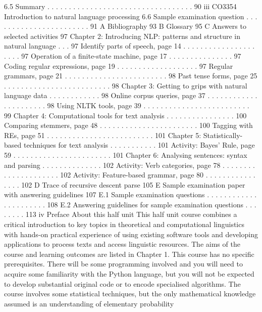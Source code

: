6.5 Summary . . . . . . . . . . . . . . . . . . . . . . . . . . . . . . . . . . 90
iii
CO3354 Introduction to natural language processing
6.6 Sample examination question . . . . . . . . . . . . . . . . . . . . . . . 91
A Bibliography 93
B Glossary 95
C Answers to selected activities 97
Chapter 2: Introducing NLP: patterns and structure in natural language . . . 97
Identify parts of speech, page 14 . . . . . . . . . . . . . . . . . . . . . 97
Operation of a finite-state machine, page 17 . . . . . . . . . . . . . . . 97
Coding regular expressions, page 19 . . . . . . . . . . . . . . . . . . . 97
Regular grammars, page 21 . . . . . . . . . . . . . . . . . . . . . . . . 98
Past tense forms, page 25 . . . . . . . . . . . . . . . . . . . . . . . . . 98
Chapter 3: Getting to grips with natural language data . . . . . . . . . . . . 98
Online corpus queries, page 37 . . . . . . . . . . . . . . . . . . . . . . 98
Using NLTK tools, page 39 . . . . . . . . . . . . . . . . . . . . . . . . . 99
Chapter 4: Computational tools for text analysis . . . . . . . . . . . . . . . . 100
Comparing stemmers, page 48 . . . . . . . . . . . . . . . . . . . . . . . 100
Tagging with REs, page 51 . . . . . . . . . . . . . . . . . . . . . . . . . 101
Chapter 5: Statistically-based techniques for text analysis . . . . . . . . . . . 101
Activity: Bayes’ Rule, page 59 . . . . . . . . . . . . . . . . . . . . . . . 101
Chapter 6: Analysing sentences: syntax and parsing . . . . . . . . . . . . . . 102
Activity: Verb categories, page 78 . . . . . . . . . . . . . . . . . . . . . 102
Activity: Feature-based grammar, page 80 . . . . . . . . . . . . . . . . 102
D Trace of recursive descent parse 105
E Sample examination paper with answering guidelines 107
E.1 Sample examination questions . . . . . . . . . . . . . . . . . . . . . . 108
E.2 Answering guidelines for sample examination questions . . . . . . . . 113
iv
Preface
About this half unit
This half unit course combines a critical introduction to key topics in theoretical and
computational linguistics with hands-on practical experience of using existing
software tools and developing applications to process texts and access linguistic
resources. The aims of the course and learning outcomes are listed in Chapter 1.
This course has no specific prerequisites. There will be some programming involved
and you will need to acquire some familiarity with the Python language, but you will
not be expected to develop substantial original code or to encode specialised
algorithms. The course involves some statistical techniques, but the only
mathematical knowledge assumed is an understanding of elementary probability
